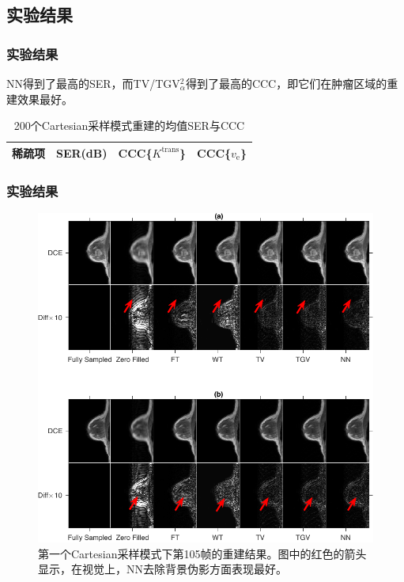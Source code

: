 \documentclass{beamer}
\newcommand{\cccve}{CCC\{$v_\mathrm{e}$\}}
\newcommand{\ccckt}{CCC\{$K^\mathrm{trans}$\}}
\begin{document}
\subsection{实验结果}
\begin{frame}
\frametitle{实验结果}
NN得到了最高的SER，而TV/TGV$_\alpha^2$得到了最高的CCC，即它们在肿瘤区域的重建效果最好。
\begin{table}
\caption{200个Cartesian采样模式重建的均值SER与CCC}
\centering
\begin{tabular}{lccc}
\hline
稀疏项&SER(dB)&\ccckt&\cccve\\
\hline

\hline
\end{tabular}
\label{tab:result}
\end{table}
\end{frame}

\begin{frame}
	\frametitle{实验结果}
	\begin{figure}[htbp]
\centerline{\includegraphics[width=1\textwidth]{../img/qetsr/figure2_1}}
\caption{
第一个Cartesian采样模式下第105帧的重建结果。图中的红色的箭头显示，在视觉上，NN去除背景伪影方面表现最好。
}
\end{figure}
\end{frame}
\end{document}
